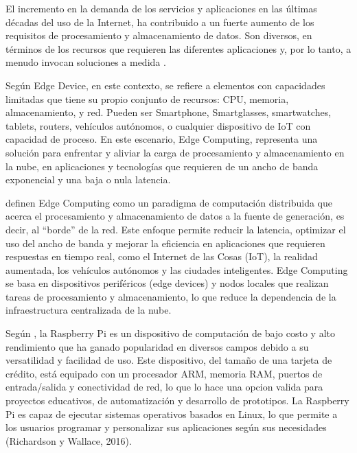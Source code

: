 

El incremento en la demanda de los servicios y aplicaciones en las últimas décadas del uso de la Internet, ha contribuido a un fuerte aumento de los requisitos de procesamiento y almacenamiento de datos.  Son diversos, en términos de los recursos que requieren las diferentes aplicaciones y, por lo tanto, a menudo invocan soluciones a medida \cite{dolui_comparison_2017}.

Según \citeauthor{medina_edge_2019} \citeyear{medina_edge_2019} Edge Device, en este contexto, se refiere a elementos con capacidades limitadas que tiene su propio conjunto de recursos: CPU, memoria, almacenamiento, y red. Pueden ser Smartphone, Smartglasses, smartwatches, tablets, routers, vehículos autónomos, o cualquier dispositivo de IoT con capacidad de proceso. En este escenario, Edge Computing, representa una solución para enfrentar y aliviar la carga de procesamiento y almacenamiento en la nube, en aplicaciones y tecnologías que requieren de un ancho de banda exponencial y una baja o nula latencia.

\citeauthor{shi_edge_2016} \citeyear{shi_edge_2016} definen Edge Computing como un paradigma de computación distribuida que acerca el procesamiento y almacenamiento de datos a la fuente de generación, es decir, al ``borde'' de la red. Este enfoque permite reducir la latencia, optimizar el uso del ancho de banda y mejorar la eficiencia en aplicaciones que requieren respuestas en tiempo real, como el Internet de las Cosas (IoT), la realidad aumentada, los vehículos autónomos y las ciudades inteligentes. Edge Computing se basa en dispositivos periféricos (edge devices) y nodos locales que realizan tareas de procesamiento y almacenamiento, lo que reduce la dependencia de la infraestructura centralizada de la nube.



Según \citeauthor{richardson_getting_2016} \citeyear{richardson_getting_2016}, la Raspberry Pi es un dispositivo de computación de bajo costo y alto rendimiento que ha ganado popularidad en diversos campos debido a su versatilidad y facilidad de uso. Este dispositivo, del tamaño de una tarjeta de crédito, está equipado con un procesador ARM, memoria RAM, puertos de entrada/salida y conectividad de red, lo que lo hace una opcion valida para proyectos educativos, de automatización y desarrollo de prototipos. La Raspberry Pi es capaz de ejecutar sistemas operativos basados en Linux, lo que permite a los usuarios programar y personalizar sus aplicaciones según sus necesidades (Richardson y Wallace, 2016).

